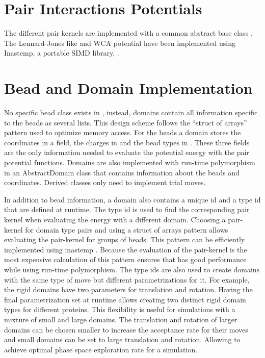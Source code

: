\documentclass[12pt, twoside]{report}
\begin{document}
\section{Pair Interactions Potentials}

The different pair kernels are implemented with a common abstract base class
. The Lennard-Jones like and \gls{WCA} potential
have been implemented using Inastemp, a portable \gls{SIMD} library,
\cite{Bramas2017}.

\section{Bead and Domain Implementation}

No specific bead class exists in \complexes, instead, domains contain all
information specific to the beads as several lists. This design scheme follows
the ``struct of arrays'' pattern \cite{wikiAOS} used to optimize memory access.
For the beads a domain stores the coordinates in a  field,
the charges in  and the bead types in
. These three fields are the only information needed to
evaluate the potential energy with the pair potential functions. Domains are
also implemented with run-time polymorphism in an AbstractDomain class that
contains information about the beads and coordinates. Derived classes only need
to implement trial moves.

In addition to bead information, a domain also contains a unique id and a type
id that are defined at runtime. The type id is used to find the corresponding
pair kernel when evaluating the energy with a different domain. Choosing a
pair-kernel for domain type pairs and using a struct of arrays pattern allows
evaluating the pair-kernel for groups of beads. This pattern can be efficiently
implemented using inastemp \cite{Bramas2017}. Because the evaluation of the
pair-kernel is the most expensive calculation of \complexes this pattern ensures
that \complexes has good performance while using run-time polymorphism. The type
ids are also used to create domains with the same type of move but different
parametrizations for it. For example, the rigid domains have two parameters for
translation and rotation. Having the final parametrization set at runtime allows
creating two distinct rigid domain types for different proteins. This
flexibility is useful for simulations with a mixture of small and large domains.
The translation and rotation of larger domains can be chosen smaller to increase
the acceptance rate for their moves and small domains can be set to large
translation and rotation. Allowing to achieve optimal phase space exploration
rate for a simulation.
\end{document}
